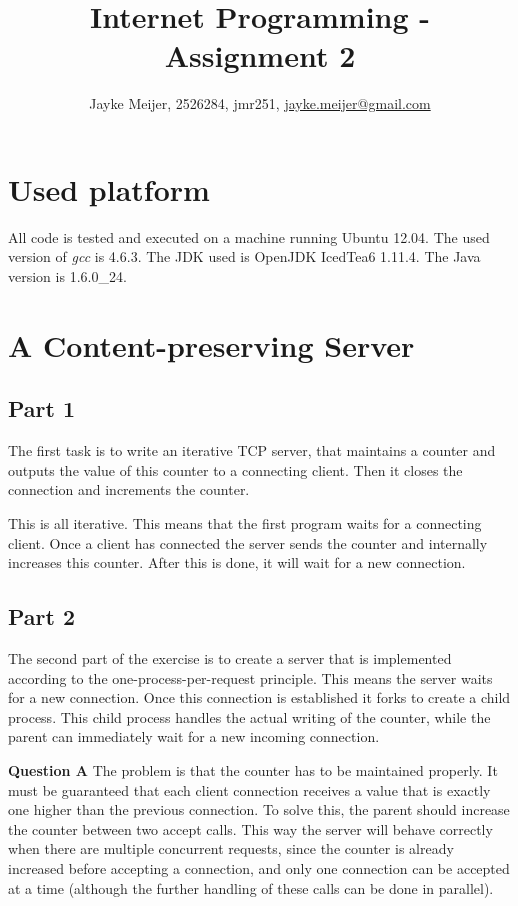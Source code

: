 \documentclass[a4paper]{article}
\title{Internet Programming - Assignment 2}
\author{Jayke Meijer, 2526284, jmr251, \url{jayke.meijer@gmail.com}}
\begin{document}
\maketitle

\tableofcontents
\pagebreak

\section{Used platform}

All code is tested and executed on a machine running Ubuntu 12.04. The used version of
\emph{gcc} is 4.6.3. The JDK used is OpenJDK IcedTea6 1.11.4. The Java version is
1.6.0\_24.

\section{A Content-preserving Server}

\subsection{Part 1}

The first task is to write an iterative TCP server, that maintains a counter and outputs
the value of this counter to a connecting client. Then it closes the connection and
increments the counter.

This is all iterative. This means that the first program waits for a connecting client. 
Once a client has connected the server sends the counter and internally increases this
counter. After this is done, it will wait for a new connection.

\subsection{Part 2}

The second part of the exercise is to create a server that is implemented according to the
one-process-per-request principle. This means the server waits for a new connection. Once
this connection is established it forks to create a child process. This child process
handles the actual writing of the counter, while the parent can immediately wait for a new
incoming connection.

\textbf{Question A} The problem is that the counter has to be maintained properly. It must
be guaranteed that each client connection receives a value that is exactly one higher than
the previous connection. To solve this, the parent should increase the counter between two
accept calls. This way the server will behave correctly when there are multiple concurrent
requests, since the counter is already increased before accepting a connection, and only
one connection can be accepted at a time (although the further handling of these
calls can be done in parallel).
\end{document}
